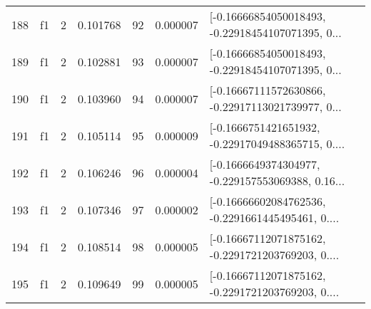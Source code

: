 \begin{tabular}{lllrlrl}
188 &  f1 &   2 &  0.101768 &   92 &  0.000007 &  [-0.16666854050018493, -0.22918454107071395, 0... \\
189 &  f1 &   2 &  0.102881 &   93 &  0.000007 &  [-0.16666854050018493, -0.22918454107071395, 0... \\
190 &  f1 &   2 &  0.103960 &   94 &  0.000007 &  [-0.16667111572630866, -0.22917113021739977, 0... \\
191 &  f1 &   2 &  0.105114 &   95 &  0.000009 &  [-0.1666751421651932, -0.22917049488365715, 0.... \\
192 &  f1 &   2 &  0.106246 &   96 &  0.000004 &  [-0.1666649374304977, -0.229157553069388, 0.16... \\
193 &  f1 &   2 &  0.107346 &   97 &  0.000002 &  [-0.16666602084762536, -0.2291661445495461, 0.... \\
194 &  f1 &   2 &  0.108514 &   98 &  0.000005 &  [-0.16667112071875162, -0.2291721203769203, 0.... \\
195 &  f1 &   2 &  0.109649 &   99 &  0.000005 &  [-0.16667112071875162, -0.2291721203769203, 0.... \\
\bottomrule
\end{tabular}
